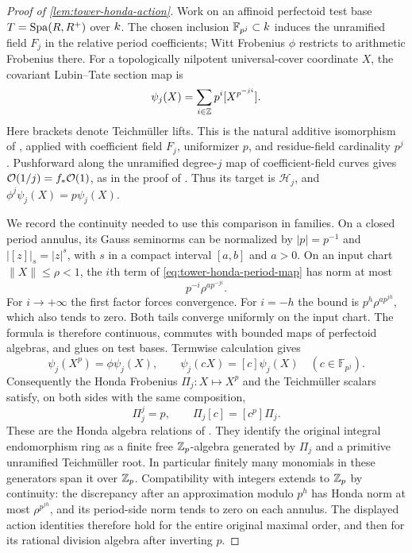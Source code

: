 \begin{proof}[Proof of \cref{lem:tower-honda-action}]
Work on an affinoid perfectoid test base $T=\operatorname{Spa}(R,R^+)$ over $k$.
The chosen inclusion $\mathbb F_{p^j}\subset k$
induces the unramified field $F_j$ in the relative period coefficients;
Witt Frobenius $\phi$ restricts to arithmetic Frobenius there.
For a topologically nilpotent universal-cover coordinate $X$, the
covariant Lubin--Tate section map is
\begin{equation}\label{eq:tower-honda-period-map}
 \psi_j(X)=\sum_{i\in\mathbb Z}p^i[X^{p^{-ji}}].
\end{equation}
Here brackets denote Teichm\"uller lifts. This is the natural additive
isomorphism of \citet[Proposition~II.2.2]{farguesScholze2021}, applied
with coefficient field $F_j$, uniformizer $p$, and residue-field
cardinality $p^j$. Pushforward along the unramified degree-$j$ map
of coefficient-field curves gives
$\mathcal O(1/j)=f_*\mathcal O(1)$, as in the proof of
\citet[Theorem~II.2.14]{farguesScholze2021}. Thus its target is
$\mathcal H_j$, and $\phi^j\psi_j(X)=p\psi_j(X)$.

We record the continuity needed to use this comparison in families.
On a closed period annulus, its Gauss seminorms can be normalized by
$|p|=p^{-1}$ and $|[z]|_s=|z|^s$, with $s$ in a compact interval
$[a,b]$ and $a>0$. On an input chart $\|X\|\leq\rho<1$, the
$i$th term of \eqref{eq:tower-honda-period-map} has norm at most
\[
 p^{-i}\rho^{a p^{-ji}}.
\]
For $i\to+\infty$ the first factor forces convergence. For $i=-h$
the bound is $p^h\rho^{a p^{jh}}$, which also tends to zero.
Both tails converge uniformly on the input chart. The formula is
therefore continuous, commutes with bounded maps of perfectoid
algebras, and glues on test bases. Termwise calculation gives
\[
 \psi_j(X^p)=\phi\psi_j(X),\qquad
 \psi_j(cX)=[c]\psi_j(X)\quad(c\in\mathbb F_{p^j}).
\]
Consequently the Honda Frobenius $\Pi_j:X\mapsto X^p$ and the
Teichm\"uller scalars satisfy, on both sides with the same composition,
\[
 \Pi_j^j=p,\qquad \Pi_j[c]=[c^p]\Pi_j.
\]
These are the Honda algebra relations of
\citet[A2.2.17--A2.2.18]{ravenel1986}. They identify the original
integral endomorphism ring as a finite free $\mathbb Z_p$-algebra generated
by $\Pi_j$ and a primitive unramified Teichm\"uller root. In
particular finitely many monomials in these generators span it over
$\mathbb Z_p$. Compatibility with integers extends to $\mathbb Z_p$ by continuity:
the discrepancy after an approximation modulo $p^h$ has Honda norm
at most $\rho^{p^{jh}}$, and its period-side norm tends to zero on
each annulus. The displayed action identities therefore hold for
the entire original maximal order, and then for its rational division
algebra after inverting $p$.


\end{proof}
